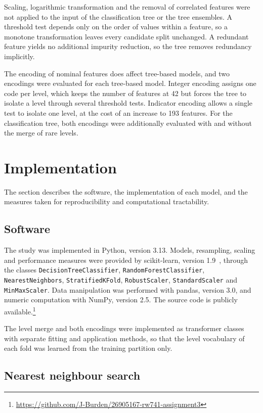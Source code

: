 Scaling, logarithmic transformation and the removal of correlated features
were not applied to the input of the classification tree or the tree
ensembles. A threshold test depends only on the order of values within a
feature, so a monotone transformation leaves every candidate split
unchanged. A redundant feature yields no additional impurity reduction, so
the tree removes redundancy implicitly.

The encoding of nominal features does affect tree-based models, and two
encodings were evaluated for each tree-based model. Integer encoding assigns
one code per level, which keeps the number of features at 42 but forces the
tree to isolate a level through several threshold tests. Indicator encoding
allows a single test to isolate one level, at the cost of an increase to 193
features. For the classification tree, both encodings were
additionally evaluated with and without the merge of rare levels.

\section{Implementation}
\label{sec:impl}

The section describes the software, the implementation of each model, and the
measures taken for reproducibility and computational tractability.

\subsection{Software}

The study was implemented in Python, version 3.13. Models, resampling,
scaling and performance measures were provided by scikit-learn, version
1.9~\cite{pedregosa2011}, through the classes
\texttt{DecisionTreeClassifier}, \texttt{RandomForestClassifier},
\texttt{NearestNeighbors}, \texttt{StratifiedKFold}, \texttt{RobustScaler},
\texttt{StandardScaler} and \texttt{MinMaxScaler}. Data manipulation was
performed with pandas, version 3.0, and numeric computation with NumPy,
version 2.5. The source code is publicly
available.\footnote{\url{https://github.com/J-Burden/26905167-rw741-assignment3}}

The level merge and both encodings were implemented as transformer classes
with separate fitting and application methods, so that the level vocabulary
of each fold was learned from the training partition only.

\subsection{Nearest neighbour search}

